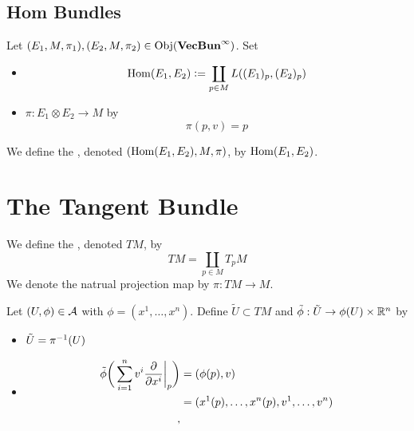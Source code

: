 \documentclass{book}
\begin{document}
	
	
	
	
	
	
\subsection{Hom Bundles}
	
	\begin{defn}
		Let $(E_1, M, \pi_1), (E_2, M, \pi_2) \in \operatorname{Obj}(\operatorname*{\text{\textbf{VecBun}}^{\infty}})$. Set
		\begin{itemize}
			\item $$ \operatorname{Hom}(E_1, E_2) \vcentcolon= \coprod_{p \in M} L((E_1)_p, (E_2)_p)$$
			\item $\pi: E_1 \otimes E_2 \rightarrow M$ by 
			$$\pi(p, v) = p$$
		\end{itemize}
		We define the , denoted $(\operatorname{Hom}(E_1, E_2), M, \pi)$, by $\operatorname{Hom}(E_1, E_2)$. 
	\end{defn}

	
	
	
	
	
	
	
	
	
	
	
	
	
	
	
	
	
	
	
	
	
	
	
	
	
	\newpage
	\section{The Tangent Bundle}
	\begin{defn}
		We define the , denoted $TM$, by $$TM = \coprod_{p \in M} T_pM$$ 
		We denote the natrual projection map by $\pi: TM \rightarrow M$.
	\end{defn}
	
	\begin{defn}
		Let $(U, \phi) \in \mathcal{A}$ with $\phi = (x^1, \dots, x^n)$. Define $\tilde{U} \subset TM$ and $\tilde{\phi}: \tilde{U} \rightarrow \phi(U) \times \mathbb{R}^{n}$ by  
		\begin{itemize}
			\item $\tilde{U} = \pi^{-1}(U)$
			\item 
			\begin{align*}
				\tilde{\phi} \bigg(\sum\limits_{i =1}^n v^i \frac{\partial}{\partial x^i} \bigg|_p \bigg) 
				&= (\phi(p), v) \\
				&= (x^1(p), \dots, x^n(p), v^1, \dots, v^n) \\
, 			\end{align*}
		\end{itemize}
	\end{defn}
\end{document}
